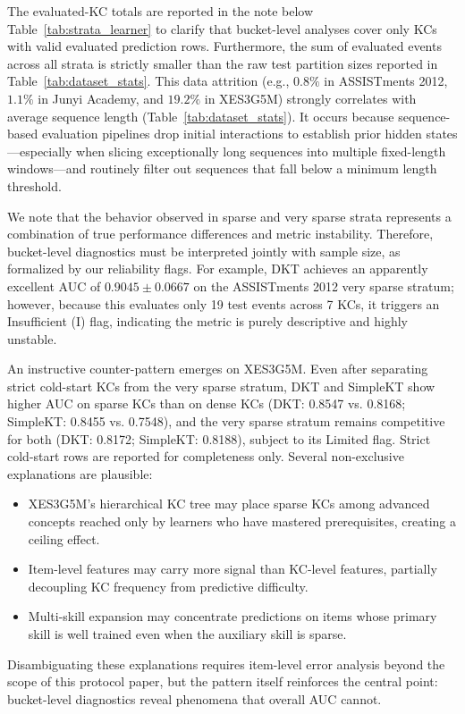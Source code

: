 

The evaluated-KC totals are reported in the note below Table~\ref{tab:strata_learner} to clarify that bucket-level analyses cover only KCs with valid evaluated prediction rows. Furthermore, the sum of evaluated events across all strata is strictly smaller than the raw test partition sizes reported in Table~\ref{tab:dataset_stats}. This data attrition (e.g., $0.8\%$ in ASSISTments 2012, $1.1\%$ in Junyi Academy, and $19.2\%$ in XES3G5M) strongly correlates with average sequence length (Table~\ref{tab:dataset_stats}). It occurs because sequence-based evaluation pipelines drop initial interactions to establish prior hidden states---especially when slicing exceptionally long sequences into multiple fixed-length windows---and routinely filter out sequences that fall below a minimum length threshold.

We note that the behavior observed in sparse and very sparse strata represents a combination of true performance differences and metric instability. Therefore, bucket-level diagnostics must be interpreted jointly with sample size, as formalized by our reliability flags. For example, DKT achieves an apparently excellent AUC of $0.9045 \pm 0.0667$ on the ASSISTments 2012 very sparse stratum; however, because this evaluates only 19 test events across 7 KCs, it triggers an Insufficient (I) flag, indicating the metric is purely descriptive and highly unstable.

An instructive counter-pattern emerges on XES3G5M. Even after separating strict cold-start KCs from the very sparse stratum, DKT and SimpleKT show higher AUC on sparse KCs than on dense KCs (DKT: 0.8547 vs. 0.8168; SimpleKT: 0.8455 vs. 0.7548), and the very sparse stratum remains competitive for both (DKT: 0.8172; SimpleKT: 0.8188), subject to its Limited flag. Strict cold-start rows are reported for completeness only. Several non-exclusive explanations are plausible:
\begin{itemize}
    \item XES3G5M's hierarchical KC tree may place sparse KCs among advanced concepts reached only by learners who have mastered prerequisites, creating a ceiling effect.
    \item Item-level features may carry more signal than KC-level features, partially decoupling KC frequency from predictive difficulty.
    \item Multi-skill expansion may concentrate predictions on items whose primary skill is well trained even when the auxiliary skill is sparse.
\end{itemize}
Disambiguating these explanations requires item-level error analysis beyond the scope of this protocol paper, but the pattern itself reinforces the central point: bucket-level diagnostics reveal phenomena that overall AUC cannot.

